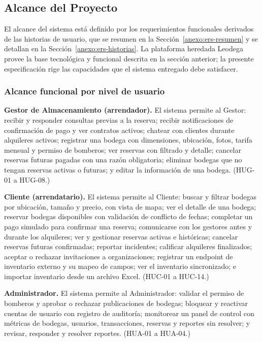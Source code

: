 \subsection{Alcance del Proyecto}

El alcance del sistema está definido por los requerimientos funcionales derivados de las historias de usuario, que se resumen en la Sección~\ref{anexo:ers-resumen} y se detallan en la Sección~\ref{anexo:ers-historias}. La plataforma heredada Leodega provee la base tecnológica y funcional descrita en la sección anterior; la presente especificación rige las capacidades que el sistema entregado debe satisfacer.

\subsubsection*{Alcance funcional por nivel de usuario}

\textbf{Gestor de Almacenamiento (arrendador).} El sistema permite al Gestor: recibir y responder consultas previas a la reserva; recibir notificaciones de confirmación de pago y ver contratos activos; chatear con clientes durante alquileres activos; registrar una bodega con dimensiones, ubicación, fotos, tarifa mensual y permiso de bomberos; ver reservas con filtrado y detalle; cancelar reservas futuras pagadas con una razón obligatoria; eliminar bodegas que no tengan reservas activas o futuras; y editar la información de una bodega. (HUG-01 a HUG-08.)

\textbf{Cliente (arrendatario).} El sistema permite al Cliente: buscar y filtrar bodegas por ubicación, tamaño y precio, con vista de mapa; ver el detalle de una bodega; reservar bodegas disponibles con validación de conflicto de fechas; completar un pago simulado para confirmar una reserva; comunicarse con los gestores antes y durante los alquileres; ver y gestionar reservas activas e históricas; cancelar reservas futuras confirmadas; reportar incidentes; calificar alquileres finalizados; aceptar o rechazar invitaciones a organizaciones; registrar un endpoint de inventario externo y su mapeo de campos; ver el inventario sincronizado; e importar inventario desde un archivo Excel. (HUC-01 a HUC-14.)

\textbf{Administrador.} El sistema permite al Administrador: validar el permiso de bomberos y aprobar o rechazar publicaciones de bodegas; bloquear y reactivar cuentas de usuario con registro de auditoría; monitorear un panel de control con métricas de bodegas, usuarios, transacciones, reservas y reportes sin resolver; y revisar, responder y resolver reportes. (HUA-01 a HUA-04.)

